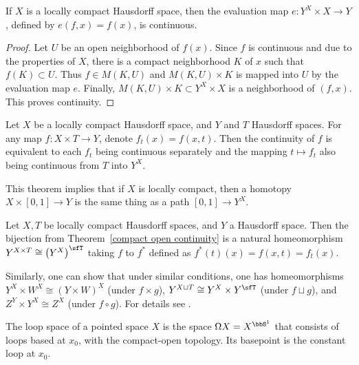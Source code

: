 \begin{prop}
    If $X$ is a locally compact Hausdorff space, then the evaluation map $e:Y^X\times X\to Y$, defined by $e(f,x)=f(x)$, is continuous.
\end{prop}
\begin{proof}
    Let $U$ be an open neighborhood of $f(x)$. Since $f$ is continuous and due to the properties of $X$, there is a compact neighborhood $K$ of $x$ such that $f(K)\subset U$. Thus $f\in M(K,U)$ and $M(K,U)\times K$ is mapped into $U$ by the evaluation map $e$. Finally, $M(K,U)\times K \subset Y^X\times X$ is a neighborhood of $(f,x)$. This proves continuity.
\end{proof}


\begin{thm}\label{compact open continuity}
    Let $X$ be a locally compact Hausdorff space, and $Y$ and $T$ Hausdorff spaces. For any map $f:X\times T\to Y$, denote $f_t(x)=f(x,t)$. Then the continuity of $f$ is equivalent to each $f_t$ being continuous separately and the mapping $t\mapsto f_t$ also being continuous from $T$ into $Y^X$. 
\end{thm}

This theorem implies that if $X$ is locally compact, then a homotopy $X\times [0,1]\to Y$ is the same thing as a path $[0,1]\to Y^X$.
\begin{cor}
    Let $X,T$ be locally compact Hausdorff spaces, and $Y$ a Hausdorff space. Then the bijection from Theorem~\ref{compact open continuity} is a natural homeomorphism $Y^{X\times T}\cong \left(Y^X\right)^\sfT $ taking $f$ to $f^\ast$ defined as $f^\ast (t)(x)=f(x,t)=f_t(x)$.
\end{cor}

Similarly, one can show that under similar conditions, one has homeomorphisms $Y^X\times W^X\cong (Y\times W)^X$ (under $f\times g$), $Y^{X\sqcup T}\cong Y^X\times Y^\sfT $ (under $f\sqcup g$), and $Z^Y\times Y^X \cong Z^X$ (under $f\circ g$). For details see \cite[\S VII.2]{Bredon}.
\begin{defn}
    The loop space of a pointed space $X$ is the space $\Omega X=X^{\bbS^1}$ that consists of loops based at $x_0$, with the compact-open topology. Its basepoint is the constant loop at $x_0$.
\end{defn}



